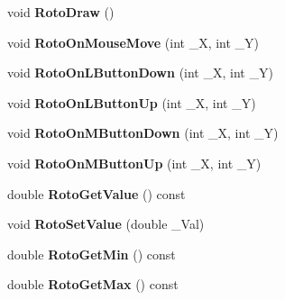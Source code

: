 \begin{DoxyCompactItemize}
\item 
\hypertarget{struct_c_tw_bar_ad722545b9fd70ef49daebf2dbd2e5713}{void {\bfseries Roto\+Draw} ()}\label{struct_c_tw_bar_ad722545b9fd70ef49daebf2dbd2e5713}

\item 
\hypertarget{struct_c_tw_bar_ac0661c2a0a2724fb341a835a8d443e32}{void {\bfseries Roto\+On\+Mouse\+Move} (int \+\_\+\+X, int \+\_\+\+Y)}\label{struct_c_tw_bar_ac0661c2a0a2724fb341a835a8d443e32}

\item 
\hypertarget{struct_c_tw_bar_a0749cdd22db0b7b2fd93c1f4e1f1a2d9}{void {\bfseries Roto\+On\+L\+Button\+Down} (int \+\_\+\+X, int \+\_\+\+Y)}\label{struct_c_tw_bar_a0749cdd22db0b7b2fd93c1f4e1f1a2d9}

\item 
\hypertarget{struct_c_tw_bar_abb9792fb4764294ec2e740625fd4306a}{void {\bfseries Roto\+On\+L\+Button\+Up} (int \+\_\+\+X, int \+\_\+\+Y)}\label{struct_c_tw_bar_abb9792fb4764294ec2e740625fd4306a}

\item 
\hypertarget{struct_c_tw_bar_aa1e1aa1fbffdd4d183c9aa47ae673b39}{void {\bfseries Roto\+On\+M\+Button\+Down} (int \+\_\+\+X, int \+\_\+\+Y)}\label{struct_c_tw_bar_aa1e1aa1fbffdd4d183c9aa47ae673b39}

\item 
\hypertarget{struct_c_tw_bar_a484ef1716f3eb965bb3febcc16c226c5}{void {\bfseries Roto\+On\+M\+Button\+Up} (int \+\_\+\+X, int \+\_\+\+Y)}\label{struct_c_tw_bar_a484ef1716f3eb965bb3febcc16c226c5}

\item 
\hypertarget{struct_c_tw_bar_ae47ab7114cd383b98330e186a65e2572}{double {\bfseries Roto\+Get\+Value} () const }\label{struct_c_tw_bar_ae47ab7114cd383b98330e186a65e2572}

\item 
\hypertarget{struct_c_tw_bar_ab35f2ab2e4291012d2815db2e2b6ffab}{void {\bfseries Roto\+Set\+Value} (double \+\_\+\+Val)}\label{struct_c_tw_bar_ab35f2ab2e4291012d2815db2e2b6ffab}

\item 
\hypertarget{struct_c_tw_bar_aa07a74b82d966b0c875ae99b4f73e76a}{double {\bfseries Roto\+Get\+Min} () const }\label{struct_c_tw_bar_aa07a74b82d966b0c875ae99b4f73e76a}

\item 
\hypertarget{struct_c_tw_bar_a254ac274a4c474a4ec3af1bd848c2fdf}{double {\bfseries Roto\+Get\+Max} () const }\label{struct_c_tw_bar_a254ac274a4c474a4ec3af1bd848c2fdf}


\end{DoxyCompactItemize}
